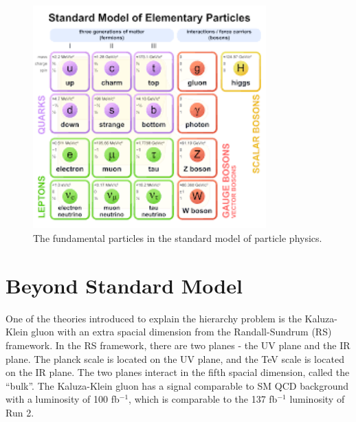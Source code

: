  \begin{figure}[h]
\centering
\includegraphics[width=0.8\textwidth]{figures/sm_blocks.png}
\caption{The fundamental particles in the standard model of particle physics.}
\label{fig:sm}
\end{figure}

\section{Beyond Standard Model}

One of the theories introduced to explain the hierarchy problem is the Kaluza-Klein gluon with an extra spacial dimension from the Randall-Sundrum (RS) framework. In the RS framework, there are two planes - the UV plane and the IR plane. The planck scale is located on the UV plane, and the TeV scale is located on the IR plane. The two planes interact in the fifth spacial dimension, called the “bulk”. The Kaluza-Klein gluon has a signal comparable to SM QCD background with a luminosity of 100 fb$^{-1}$, which is comparable to the 137 fb$^{-1}$ luminosity of Run 2.